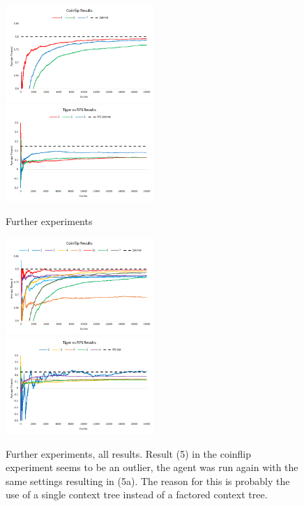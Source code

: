 \documentclass[paper=a4, fontsize=11pt]{scrartcl} %
\numberwithin{equation}{section} %
\numberwithin{figure}{section} %
\numberwithin{table}{section} %
\begin{document}
\begin{figure}[h]
\includegraphics[width=0.5\textwidth]{plots/coinflip_tests1}
\includegraphics[width=0.5\textwidth]{plots/rps_tiger_1}
\caption{\label{plot:cointests}Further experiments}
\end{figure}

\begin{figure}[h]
\includegraphics[width=0.5\textwidth]{plots/coinflip_tests}
\includegraphics[width=0.5\textwidth]{plots/rps_tiger_trim}
\caption{\label{plot:cointests_all}Further experiments, all results. Result (5) in the coinflip experiment seems to be an outlier, the agent was run again with the same settings resulting in (5a). The reason for this is probably the use of a single context tree instead of a factored context tree.}
\end{figure}
\end{document}
